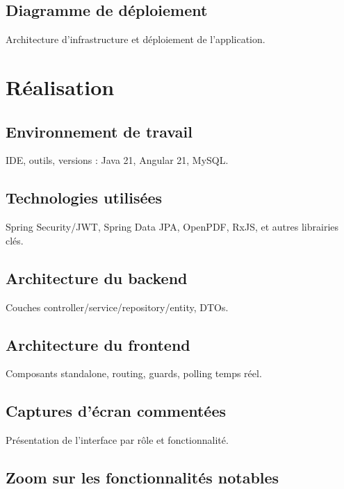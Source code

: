\documentclass[14pt,a4paper]{article}
\begin{document}
\subsection{Diagramme de déploiement}
\hspace{.8cm} Architecture d'infrastructure et déploiement de l'application.

\newpage
\section{Réalisation}

\subsection{Environnement de travail}
\hspace{.8cm} IDE, outils, versions : Java 21, Angular 21, MySQL.

\subsection{Technologies utilisées}
\hspace{.8cm} Spring Security/JWT, Spring Data JPA, OpenPDF, RxJS, et autres librairies clés.

\subsection{Architecture du backend}
\hspace{.8cm} Couches controller/service/repository/entity, DTOs.

\subsection{Architecture du frontend}
\hspace{.8cm} Composants standalone, routing, guards, polling temps réel.

\subsection{Captures d'écran commentées}
\hspace{.8cm} Présentation de l'interface par rôle et fonctionnalité.

\subsection{Zoom sur les fonctionnalités notables}
\end{document}
